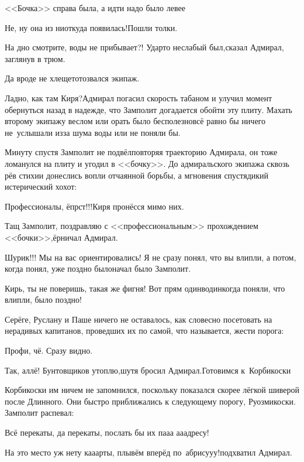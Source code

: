 \diagdash <<Бочка>> справа была, а идти надо было левее\myldots{}

\diagdash Не, ну она из ниоткуда появилась!\mdash Пошли толки.

\diagdash На дно смотрите, воды не прибывает?! Удар\sdash то неслабый был,\mdash сказал Адмирал, заглянув в трюм.

\diagdash Да вроде не хлещет\myldots{}\mdash отозвался экипаж.

\diagdash Ладно, как там Киря?\mdash Адмирал погасил скорость табаном и улучил момент обернуться назад в надежде, что Замполит догадается обойти эту плиту. Махать второму экипажу веслом или орать было бесполезно\mdash всё равно бы ничего не~услышали из\sdash за шума воды или не поняли бы. 

Минуту спустя Замполит не подвёл\mdash повторяя траекторию Адмирала, он тоже ломанулся на плиту и угодил в <<бочку>>. До адмиральского экипажа сквозь рёв стихии донеслись вопли отчаянной борьбы, а мгновения спустя\mdash дикий истерический хохот:

\diagdash Профессионалы, ёпрст!!!\mdash Киря пронёсся мимо них.

\diagdash Тащ Замполит, поздравляю с <<профессиональным>> прохождением <<бочки>>,\mdash ёрничал Адмирал.

\diagdash Шурик!!! Мы на вас ориентировались! Я не сразу понял, что вы влипли, а потом, когда понял, уже поздно было\myldots{}\mdash начал было Замполит.

\diagdash Кирь, ты не поверишь, такая же фигня! Вот прям один\sdash в\sdash один\mdash когда поняли, что влипли, было поздно!

Серёге, Руслану и Паше ничего не оставалось, как словесно посетовать на нерадивых капитанов, проведших их по самой, что называется, жести порога:

\diagdash Профи, чё. Сразу видно.

\diagdash Так, аллё! Бунтовщиков утоплю,\mdash шутя бросил Адмирал.\mdash Готовимся к~Корбикоски\myldots{}

Корбикоски им ничем не запомнился, поскольку показался скорее лёгкой шиверой после Длинного. Они быстро приближались к следующему порогу, Руозмикоски. Замполит распевал:

\diagdash Всё перекаты, да перекаты, послать бы их па\sdash а\sdash а а\sdash а\sdash адресу!

\diagdash На это место уж нету ка\sdash а\sdash арты, плывём вперёд по~абрису\sdash у\sdash у!\mdash подхватил Адмирал.

